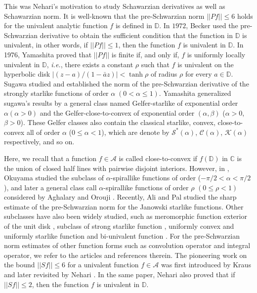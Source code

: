 \documentclass[a4paper,12pt]{amsart}
\theoremstyle{plain}
\theoremstyle{definition}
\theoremstyle{plain}
\newcounter {own}
\begin{document}
This was Nehari's motivation to study Schawarzian derivatives as well as Schawarzian norm. It is well-known that the pre-Schwarzian norm $||Pf||\leq 6$ holds for the univalent analytic function $f$ is defined in $\mathbb{D}$. In $1972$, Becker \cite{Becker-JRAM-1983} used the pre-Schwarzian derivative to obtain the sufficient condition that the function in $\mathbb{D}$ is univalent, in other words, if $||Pf||\leq1$, then the function $f$ is univalent in $\mathbb{D}$. In 1976, Yamashita \cite{Yamashita-MM-1976} proved that $||Pf||$ is finite if, and only if, $f$ is uniformly locally univalent in $\mathbb{D}$, \emph{i.e.}, there exists a constant $\rho$ such that $f$ is univalent on the hyperbolic disk $|(z-a)/(1-\bar{a}z)|<\tanh\rho$ of radius $\rho$ for every $a\in\mathbb{D}$. Sugawa \cite{Sugawa-AUMCDS-1996} studied and established the norm of the pre-Schwarzian derivative of the strongly starlike functions of order $\alpha\; (0<\alpha\leq1)$. Yamashita\cite{Yamashita-HMJ-1999} generalized sugawa's results by a general class named Gelfer-starlike of exponential order $\alpha (\alpha>0)$ and the Gelfer-close-to-convex of exponential order $(\alpha,\beta)$ ($\alpha>0$, $\beta>0$). These Gelfer classes also contain the classical starlike, convex, close-to-convex all of order $\alpha$ ($0\leq\alpha<1$), which are denote by $\mathcal{S^*(\alpha)}$, $\mathcal{C(\alpha)}$, $\mathcal{K(\alpha)}$ respectively, and so on.\vspace{2mm}

Here, we recall that a function $f\in\mathcal{A}$ is called close-to-convex if $f(\mathbb{D})$ in $\mathbb{C}$ is the union of closed half lines with pairwise disjoint interiors. However, in \cite{Okuyama-CVTA-2000}, Okuyama  studied the subclass of $\alpha$-spirallike functions of order ($-\pi/2<\alpha<\pi/2$), and later a general class call $\alpha$-spirallike functions of order $\rho$ $(0\leq\rho<1)$ considered by Aghalary and Orouji \cite{Aghalary-Orouji-COAT-2014}. Recently, Ali and Pal \cite{Ali-Pal-MM-2023} studied the sharp estimate of the pre-Schwarzian norm for the Janowski starlike functions. Other subclasses have also been widely studied, such as meromorphic function exterior of the unit disk \cite{Ponnusamy-Sugawa-JKMS-2008}, subclass of strong starlike function \cite{Ponnusamy-Sahoo-M-2008}, uniformly convex and uniformly starlike function \cite{Kanas-AMC-2009} and bi-univalent function \cite{Rahmatan-Najafzadeh-Ebadian-BIMS-2017}. For the pre-Schwarzian norm estimates of other function forms such as convolution operator and integral operator, we refer to the articles \cite{Choi-Kim-Ponnusamy-Sugawa-JMAP-2005,Kim-Sugawa-PEMS-2006,Parvatham-Ponnusamy-Sahoo-HMJ-2008,Ponnusamy-Sahoo-JMAA-2008,Nehari-BAMS-1949} and references therein. The pioneering work on the bound \( ||Sf|| \leq 6 \) for a univalent function \( f \in \mathcal{A} \) was first introduced by Kraus \cite{Kraus-1932} and later revisited by Nehari \cite{Nehari-BAMS-1949}. In the same paper, Nehari also proved that if $||Sf||\leq2$, then the function $f$ is univalent in $\mathbb{D}$.\vspace{2mm}
\end{document}

